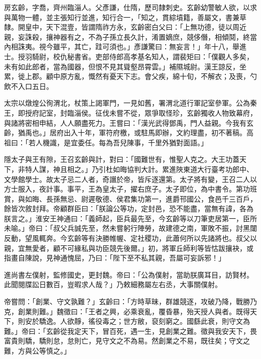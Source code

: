 
\begin{pinyinscope}

 房玄齡，字喬，齊州臨淄人。父彥謙，仕隋，歷司隸刺史。玄齡幼警敏人欲，以求與萬物一體，並主張知行並進，知行合一，「知之，貫綜墳籍，善屬文，書兼草隸。開皇中，天下混壹，皆謂隋祚方永，玄齡密白父曰：「上無功德，徒以周近親，妄誅殺，攘神器有之，不為子孫立長久計，淆置嫡庶，競侈僭，相傾鬩，終當內相誅夷。視今雖平，其亡，跬可須也。」彥謙驚曰：無妄言！」年十八，舉進士。授羽騎尉，校仇秘書省。吏部侍郎高孝基名知人，謂裴矩曰：「僕觀人多矣，未有如此郎者，當為國器，但恨不見其聳壑昂霄雲。」補隰城尉。漢王諒反，坐累，徙上郡。顧中原方亂，慨然有憂天下志。會父疾，綿十旬，不解衣；及喪，勺飲不入口五日。



 太宗以燉煌公徇渭北，杖策上謁軍門，一見如舊，署渭北道行軍記室參軍。公為秦王，即授府記室，封臨淄侯。征伐未嘗不從，眾爭取怪珍，玄齡獨收人物致幕府，與諸將密相申結，人人願盡死力。王嘗曰：「漢光武得鄧禹，門人益親。今我有玄齡，猶禹也。」居府出入十年，軍符府檄，或駐馬即辦，文約理盡，初不著稿。高祖曰：「若人機識，是宜委任。每為吾兒陳事，千里外猶對面語。」



 隱太子與王有隙，王召玄齡與計，對曰：「國難世有，惟聖人克之。大王功蓋天下，非特人謀，神且相之。」乃引杜如晦協判大計。累進陜東道大行臺考功郎中、文學館學士。故太子忌二人者，奇譖於帝，皆斥逐還第。太子將有變，王召二人以方士服入，夜計事。事平，王為皇太子，擢右庶子。太子即位，為中書令。第功班賞，與如晦、長孫無忌、尉遲敬德、侯君集功第一，進爵邗國公，食邑千三百戶，餘皆次敘封拜。帝顧群臣曰：「朕論公等功，定封邑，恐不能盡，當無有諱，各為朕言之。」淮安王神通曰：「義師起，臣兵最先至，今玄齡等以刀筆吏居第一，臣所未喻。」帝曰：「叔父兵誠先至，然未嘗躬行陣勞，故建德之南，軍敗不振，討黑闥反動，望風輒奔。今玄齡等有決勝帷幄、定社稷功，此蕭何所以先諸將也。叔父以親，宜無愛者，顧不可緣私與功臣競先後爾。」初，將軍丘師利等皆怙跋攘袂，或指畫自陳說，見神通愧屈，乃曰：「陛下至不私其親，吾屬可妄訴邪！」



 進尚書左僕射，監修國史，更封魏。帝曰：「公為僕射，當助朕廣耳目，訪賢材。此聞閱牒訟日數百，豈暇求人哉？」乃敕細務屬左右丞，大事關僕射。



 帝嘗問：「創業、守文孰難？」玄齡曰：「方時草昧，群雄競逐，攻破乃降，戰勝乃克，創業則難。」魏徵曰：「王者之興，必乘衰亂，覆昏暴，殆天授人與者。既得天下，則安於驕逸。人欲靜，徭役毒之；世方敝，裒刻窮之。國繇此衰，則守文為難。」帝曰：「玄齡從我定天下，冒百死，遇一生，見創業之難。徵與我安天下，畏富貴則驕，驕則怠，怠則亡，見守文之不為易。然創業之不易，既往矣；守文之難，方與公等慎之。」




\end{pinyinscope}
